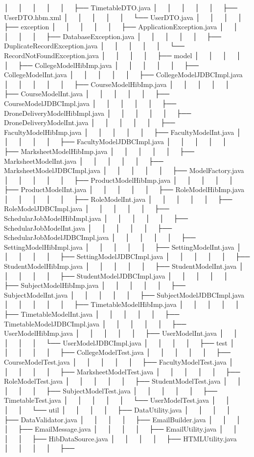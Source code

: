 │   │   │   │   │   ├── Timetable\+DTO.\+java │   │   │   │   │   ├── User\+DTO.\+hbm.\+xml │   │   │   │   │   └── User\+DTO.\+java │   │   │   │   ├── exception │   │   │   │   │   ├── Application\+Exception.\+java │   │   │   │   │   ├── Database\+Exception.\+java │   │   │   │   │   ├── Duplicate\+Record\+Exception.\+java │   │   │   │   │   └── Record\+Not\+Found\+Exception.\+java │   │   │   │   ├── model │   │   │   │   │   ├── College\+Model\+Hib\+Imp.\+java │   │   │   │   │   ├── College\+Model\+Int.\+java │   │   │   │   │   ├── College\+Model\+JDBCImpl.\+java │   │   │   │   │   ├── Course\+Model\+Hib\+Imp.\+java │   │   │   │   │   ├── Course\+Model\+Int.\+java │   │   │   │   │   ├── Course\+Model\+JDBCImpl.\+java │   │   │   │   │   ├── Drone\+Delivery\+Model\+Hib\+Impl.\+java │   │   │   │   │   ├── Drone\+Delivery\+Model\+Int.\+java │   │   │   │   │   ├── Faculty\+Model\+Hib\+Imp.\+java │   │   │   │   │   ├── Faculty\+Model\+Int.\+java │   │   │   │   │   ├── Faculty\+Model\+JDBCImpl.\+java │   │   │   │   │   ├── Marksheet\+Model\+Hib\+Imp.\+java │   │   │   │   │   ├── Marksheet\+Model\+Int.\+java │   │   │   │   │   ├── Marksheet\+Model\+JDBCImpl.\+java │   │   │   │   │   ├── Model\+Factory.\+java │   │   │   │   │   ├── Product\+Model\+Hib\+Imp.\+java │   │   │   │   │   ├── Product\+Model\+Int.\+java │   │   │   │   │   ├── Role\+Model\+Hib\+Imp.\+java │   │   │   │   │   ├── Role\+Model\+Int.\+java │   │   │   │   │   ├── Role\+Model\+JDBCImpl.\+java │   │   │   │   │   ├── Schedular\+Job\+Model\+Hib\+Impl.\+java │   │   │   │   │   ├── Schedular\+Job\+Model\+Int.\+java │   │   │   │   │   ├── Schedular\+Job\+Model\+JDBCImpl.\+java │   │   │   │   │   ├── Setting\+Model\+Hib\+Impl.\+java │   │   │   │   │   ├── Setting\+Model\+Int.\+java │   │   │   │   │   ├── Setting\+Model\+JDBCImpl.\+java │   │   │   │   │   ├── Student\+Model\+Hib\+Imp.\+java │   │   │   │   │   ├── Student\+Model\+Int.\+java │   │   │   │   │   ├── Student\+Model\+JDBCImpl.\+java │   │   │   │   │   ├── Subject\+Model\+Hib\+Imp.\+java │   │   │   │   │   ├── Subject\+Model\+Int.\+java │   │   │   │   │   ├── Subject\+Model\+JDBCImpl.\+java │   │   │   │   │   ├── Timetable\+Model\+Hib\+Imp.\+java │   │   │   │   │   ├── Timetable\+Model\+Int.\+java │   │   │   │   │   ├── Timetable\+Model\+JDBCImpl.\+java │   │   │   │   │   ├── User\+Model\+Hib\+Imp.\+java │   │   │   │   │   ├── User\+Model\+Int.\+java │   │   │   │   │   └── User\+Model\+JDBCImpl.\+java │   │   │   │   ├── test │   │   │   │   │   ├── College\+Model\+Test.\+java │   │   │   │   │   ├── Course\+Model\+Test.\+java │   │   │   │   │   ├── Faculty\+Model\+Test.\+java │   │   │   │   │   ├── Marksheet\+Model\+Test.\+java │   │   │   │   │   ├── Role\+Model\+Test.\+java │   │   │   │   │   ├── Student\+Model\+Test.\+java │   │   │   │   │   ├── Subject\+Model\+Test.\+java │   │   │   │   │   ├── Timetable\+Test.\+java │   │   │   │   │   └── User\+Model\+Test.\+java │   │   │   │   └── util │   │   │   │   ├── Data\+Utility.\+java │   │   │   │   ├── Data\+Validator.\+java │   │   │   │   ├── Email\+Builder.\+java │   │   │   │   ├── Email\+Message.\+java │   │   │   │   ├── Email\+Utility.\+java │   │   │   │   ├── Hib\+Data\+Source.\+java │   │   │   │   ├── HTMLUtility.\+java │   │   │   │   ├── 